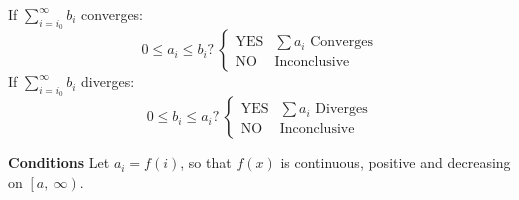 \documentclass{article}
\begin{document}
\begin{multicols}{2}
\begin{tcolorboxcols}[title={Comparison Test}]
        \noindent If $\displaystyle \sum_{i=i_0}^\infty b_i$ converges:
        \begin{equation*}
            \text{$0\leqslant a_i \leqslant b_i$?}\:
            \begin{cases}
                \text{YES} & \text{$\sum a_i$ Converges} \\
                \text{NO}  & \text{Inconclusive}
            \end{cases}
        \end{equation*}
        If $\displaystyle \sum_{i=i_0}^\infty b_i$ diverges:
        \begin{equation*}
            \text{$0\leqslant b_i \leqslant a_i$?}\:
            \begin{cases}
                \text{YES} & \text{$\sum a_i$ Diverges} \\
                \text{NO}  & \text{Inconclusive}
            \end{cases}
        \end{equation*}
    \end{tcolorboxcols}
    \begin{tcolorboxcols}[title={Integral Test}]
        \textbf{Conditions} Let $a_i=f(i)$, so that $f(x)$ is continuous, positive and decreasing on $\left[a,\:\infty\right)$.
        

\end{tcolorboxcols}
\end{multicols}
\end{document}

